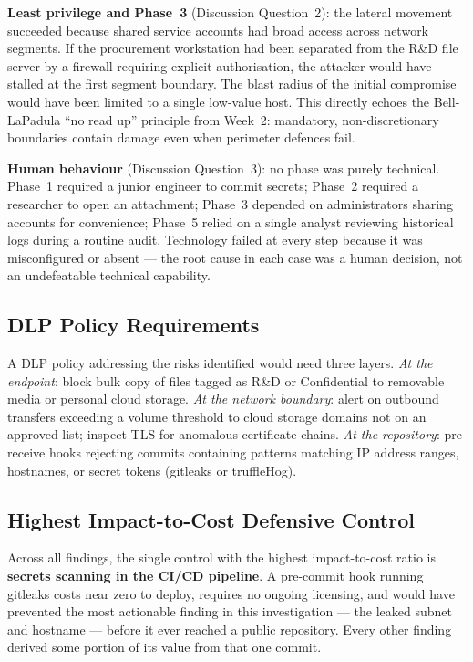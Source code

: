 \documentclass[11pt,a4paper]{article}
\begin{document}
\textbf{Least privilege and Phase~3} (Discussion Question~2): the lateral movement
succeeded because shared service accounts had broad access across network segments.
If the procurement workstation had been separated from the R\&D file server by a
firewall requiring explicit authorisation, the attacker would have stalled at the first
segment boundary.  The blast radius of the initial compromise would have been
limited to a single low-value host.  This directly echoes the Bell-LaPadula ``no read up''
principle from Week~2: mandatory, non-discretionary boundaries contain damage even when
perimeter defences fail.

\textbf{Human behaviour} (Discussion Question~3): no phase was purely technical.
Phase~1 required a junior engineer to commit secrets; Phase~2 required a researcher to
open an attachment; Phase~3 depended on administrators sharing accounts for convenience;
Phase~5 relied on a single analyst reviewing historical logs during a routine audit.
Technology failed at every step because it was misconfigured or absent --- the root cause
in each case was a human decision, not an undefeatable technical capability.

\subsection{DLP Policy Requirements}

A DLP policy addressing the risks identified would need three layers.
\textit{At the endpoint}: block bulk copy of files tagged as R\&D or Confidential to
removable media or personal cloud storage.
\textit{At the network boundary}: alert on outbound transfers exceeding a volume threshold
to cloud storage domains not on an approved list; inspect TLS for anomalous certificate
chains.
\textit{At the repository}: pre-receive hooks rejecting commits containing patterns matching
IP address ranges, hostnames, or secret tokens (gitleaks or truffleHog).

\subsection{Highest Impact-to-Cost Defensive Control}

Across all findings, the single control with the highest impact-to-cost ratio is
\textbf{secrets scanning in the CI/CD pipeline}.  A pre-commit hook running gitleaks
costs near zero to deploy, requires no ongoing licensing, and would have prevented the
most actionable finding in this investigation --- the leaked subnet and hostname --- before
it ever reached a public repository.  Every other finding derived some portion of its
value from that one commit.
\end{document}
